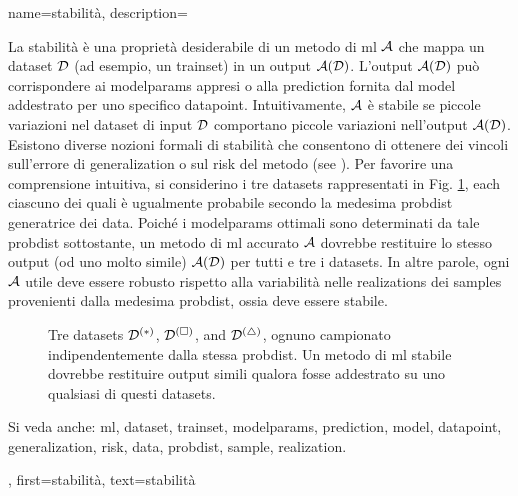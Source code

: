 {name={stabilità},
	description={La stabilità è una proprietà desiderabile di un metodo di \gls{ml} $\mathcal{A}$ 
	che mappa un 
		\gls{dataset} $\mathcal{D}$ (ad esempio, un \gls{trainset}) in un output $\mathcal{A}(\mathcal{D})$. L'output
		$\mathcal{A}(\mathcal{D})$ può corrispondere ai \gls{modelparams} appresi o alla \gls{prediction} fornita 
		dal \gls{model} addestrato per uno specifico \gls{datapoint}. Intuitivamente, $\mathcal{A}$ è stabile se 
		piccole variazioni nel \gls{dataset} di input $\mathcal{D}$ comportano piccole variazioni nell’output 
		$\mathcal{A}(\mathcal{D})$. Esistono diverse nozioni formali di stabilità che consentono di ottenere dei 
		vincoli sull’errore di \gls{generalization} o sul \gls{risk} del metodo (see \cite[Ch.~13]{ShalevMLBook}).
		Per favorire una comprensione intuitiva, si considerino i tre \glspl{dataset} rappresentati in Fig. 
		\ref{fig_three_data_stability_dict}, each 
		ciascuno dei quali è ugualmente probabile secondo la medesima \gls{probdist} generatrice dei 
		\gls{data}. Poiché i \gls{modelparams} ottimali sono determinati da tale \gls{probdist} sottostante, un 
		metodo di \gls{ml} accurato $\mathcal{A}$ dovrebbe restituire lo stesso output (od uno molto simile) 
		$\mathcal{A}(\mathcal{D})$ 
		per tutti e tre i \glspl{dataset}. In altre parole, ogni $\mathcal{A}$ utile deve essere robusto rispetto alla 
		variabilità nelle \glspl{realization} dei \glspl{sample} provenienti dalla medesima \gls{probdist}, ossia 
		deve essere stabile.		
		\begin{figure}[H]
			\centering
			\caption{Tre \glspl{dataset} $\mathcal{D}^{(*)}$, $\mathcal{D}^{(\square)}$, and $\mathcal{D}^{(\triangle)}$, 
				ognuno campionato indipendentemente dalla stessa \gls{probdist}. Un metodo di \gls{ml} 
				stabile dovrebbe restituire output simili qualora fosse addestrato su uno qualsiasi di questi 
				\glspl{dataset}. \label{fig_three_data_stability_dict}}
		\end{figure}
		Si veda anche: \gls{ml}, \gls{dataset}, \gls{trainset}, \gls{modelparams}, \gls{prediction}, \gls{model}, \gls{datapoint}, \gls{generalization}, \gls{risk}, \gls{data}, \gls{probdist}, \gls{sample}, \gls{realization}.}, 
	first={stabilità}, 
	text={stabilità} 
}


